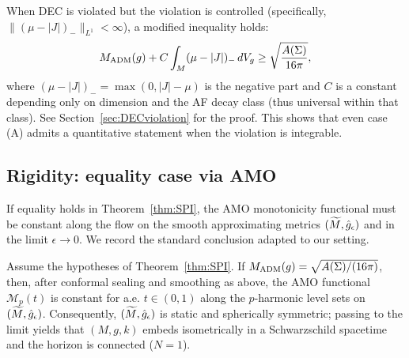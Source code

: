 \begin{remark}\label{rem:DECviolation}
When DEC is violated but the violation is controlled (specifically, $\|(\mu - |J|)_-\|_{L^1} < \infty$), a modified inequality holds:
\[
    M_{\mathrm{ADM}}(g) + C \int_M (\mu - |J|)_- \, dV_g \ge \sqrt{\frac{A(\Sigma)}{16\pi}},
\]
where $(\mu - |J|)_- = \max(0, |J| - \mu)$ is the negative part and $C$ is a constant depending only on dimension and the AF decay class (thus universal within that class). See Section~\ref{sec:DECviolation} for the proof. This shows that even case (A) admits a quantitative statement when the violation is integrable.
\end{remark}

\subsection{Rigidity: equality case via AMO}
If equality holds in Theorem~\ref{thm:SPI}, the AMO monotonicity functional must be constant along the flow on the smooth approximating metrics $(\widetilde{M},\hat g_\epsilon)$ and in the limit $\epsilon\to 0$. We record the standard conclusion adapted to our setting.

\begin{theorem}\label{thm:RigidityAMO}
Assume the hypotheses of Theorem~\ref{thm:SPI}. If $M_{\mathrm{ADM}}(g)=\sqrt{A(\Sigma)/(16\pi)}$, then, after conformal sealing and smoothing as above, the AMO functional $\mathcal{M}_p(t)$ is constant for a.e. $t\in(0,1)$ along the $p$-harmonic level sets on $(\widetilde{M},\hat g_\epsilon)$. Consequently, $(\widetilde{M},\hat g_\epsilon)$ is static and spherically symmetric; passing to the limit yields that $(M,g,k)$ embeds isometrically in a Schwarzschild spacetime and the horizon is connected ($N=1$).
\end{theorem}


